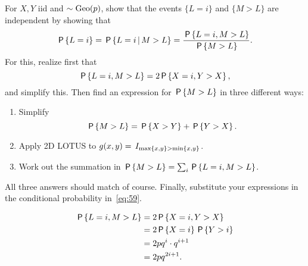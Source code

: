 \documentclass[a4paper,11pt]{article}
\begin{document}
\begin{exercise}\label{ex:10}
For  $X, Y$ iid and $\sim \Geo{p}$, show that the events $\{L=i\}$ and $\{M>L\}$ are independent by showing that
\begin{equation}
  \label{eq:59}
\P{L=i} = \P{L=i \given M>L} =  \frac{\P{L=i, M > L}}{\P{M>L}}.
\end{equation}
For this, realize first that
\begin{equation}
  \label{eq:62}
\P{L=i,  M > L} = 2\P{X=i,Y > X},
\end{equation}
and simplify this. Then find an expression for $\P{M>L}$ in three different ways:
\begin{enumerate}
\item Simplify
  \begin{equation}
    \label{eq:61}
\P{M>L}  = \P{X>Y} + \P{Y > X}.
  \end{equation}
\item Apply  2D LOTUS to $g(x,y) = \1{\max\{x,y\}>\min\{x,y\}}$.
\item Work out the summation in $\P{M>L} = \sum_{i} \P{L=i, M>L}$.
\end{enumerate}
All three answers should match of course. Finally, substitute your expressions in the conditional probability in~\cref{eq:59}.
\begin{solution}
\begin{align}
\P{L=i,  M > L}
&= 2\P{X=i,Y > X} \\
&= 2\P{X=i}\P{Y > i} \\
&= 2pq^i\cdot q^{i+1}\\
&= 2p q^{2i+1}.
\end{align}


\end{solution}
\end{exercise}
\end{document}
